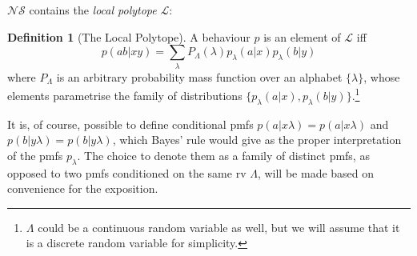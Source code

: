\documentclass[10pt, a4paper]{article}
\numberwithin{equation}{section} %
\newcounter{stmt} %
\theoremstyle{definition}
\newtheorem{defn}[stmt]{Definition}
\theoremstyle{plain}
\newcommand{\?}{\mathrel{?}} %
\newcommand{\Ls}{\mathcal{L}}
\newcommand{\NSs}{\mathcal{NS}}
\begin{document}
    \(\NSs\) contains the \emph{local polytope} \(\Ls\):
    \begin{defn}[The Local Polytope]
      A behaviour \(p\) is an element of \(\Ls\) iff
      \begin{equation}\label{eqn:localdef}
        p(ab|xy) = \sum_{\lambda} P_{\Lambda}({\lambda}) p_{{\lambda}}(a|x)p_{{\lambda}}(b|y)
      \end{equation}
      where \(P_{\Lambda}\) is an arbitrary probability mass function over an alphabet \(\{\lambda\}\), whose elements parametrise the family of distributions \(\{p_{\lambda}(a|x), p_{\lambda}(b|y)\}\).\footnote{\(\Lambda\) could be a continuous random variable as well, but we will assume that it is a discrete random variable for simplicity.}
    \end{defn}
    It is, of course, possible to define conditional pmfs \(p(a|x\lambda) = p(a|x\lambda)\) and \(p(b|y\lambda) = p(b|y\lambda)\), which Bayes' rule would give as the proper interpretation of the pmfs \(p_{\lambda}\). The choice to denote them as a family of distinct pmfs, as opposed to two pmfs conditioned on the same rv \(\Lambda\), will be made based on convenience for the exposition.
\end{document}
